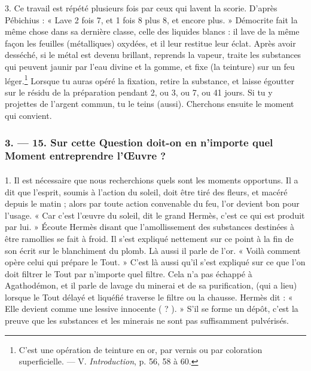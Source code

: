 \documentclass[a4paper, 11pt, oneside, polutonikogreek, french]{article}
\begin{document}
3. Ce travail est répété plusieurs fois par ceux qui lavent la scorie. D'après Pébichius : « Lave 2 fois 7, et 1 fois 8 plus 8, et encore plus. » Démocrite fait la même chose dans sa dernière classe, celle des liquides blancs : il lave de la même façon les feuilles (métalliques) oxydées, et il leur restitue leur éclat. Après avoir desséché, si le métal est devenu brillant, reprends la vapeur, traite les substances qui peuvent jaunir par l'eau divine et la gomme, et fixe (la teinture) sur un feu léger.\footnote{C'est une opération de teinture en or, par vernis ou par coloration superficielle. --- V. \emph{Introduction}, p. 56, 58 à 60.} Lorsque tu auras opéré la fixation, retire la substance, et laisse égoutter sur le résidu de la préparation pendant 2, ou 3, ou 7, ou 41 jours. Si tu y projettes de l'argent commun, tu le teins (aussi). Cherchons ensuite le moment qui convient.

\bigskip
\centerline{\EightStarTaper}
\centerline{\EightStarTaper\EightStarTaper}
\bigskip

\subsubsection{3. --- 15. Sur cette Question doit-on en n'importe quel Moment entreprendre l'Œuvre ?}
\paragraph{}
1. Il est nécessaire que nous recherchions quels sont les moments opportuns. Il a dit que l'esprit, soumis à l'action du soleil, doit être tiré des fleurs, et macéré depuis le matin ; alors par toute action convenable du feu, l'or devient bon pour l'usage. « Car c'est l'œuvre du soleil, dit le grand Hermès, c'est ce qui est produit par lui. » Écoute Hermès disant que l'amollissement des substances destinées à être ramollies se fait à froid. Il s'est expliqué nettement sur ce point à la fin de son écrit sur le blanchiment du plomb. Là aussi il parle de l'or. « Voilà comment opère celui qui prépare le Tout. » C'est là aussi qu'il s'est expliqué sur ce que l'on doit filtrer le Tout par n'importe quel filtre. Cela n'a pas échappé à Agathodémon, et il parle de lavage du minerai et de sa purification, (qui a lieu) lorsque le Tout délayé et liquéfié traverse le filtre ou la chausse. Hermès dit : « Elle devient comme une lessive innocente ( ? ). » S'il se forme un dépôt, c'est la preuve que les substances et les minerais ne sont pas suffisamment pulvérisés.
\end{document}
